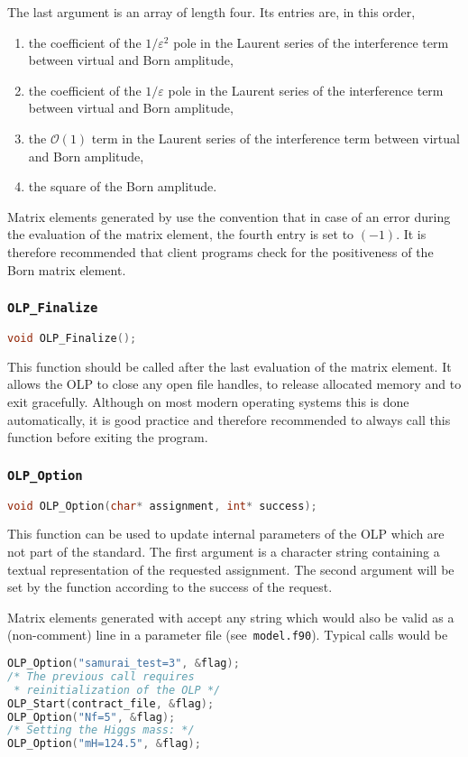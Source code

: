 The last argument is an array of length four. Its entries are, in this order,
\begin{enumerate}
\item the coefficient of the $1/\varepsilon^2$ pole in the Laurent series
   of the interference term between virtual and Born amplitude,
\item the coefficient of the $1/\varepsilon$ pole in the Laurent series
   of the interference term between virtual and Born amplitude,
\item the $\mathcal{O}(1)$ term in the Laurent series
   of the interference term between virtual and Born amplitude,
\item the square of the Born amplitude.
\end{enumerate}

Matrix elements generated by \gosamv{} use the convention that in case
of an error during the evaluation of the matrix element, the fourth
entry is set to $(-1)$. It is therefore recommended that client programs
check for the positiveness of the Born matrix element.

\subsubsection{\texttt{OLP\_Finalize}}
\begin{lstlisting}[language=C]
void OLP_Finalize();
\end{lstlisting}

This function should be called after the last evaluation of the matrix
element. It allows the OLP to close any open file handles, to release
allocated memory and to exit gracefully.
Although on most modern operating systems this is done automatically,
it is good practice and therefore recommended to always call this function
before exiting the program.

\subsubsection{\texttt{OLP\_Option}}
\begin{lstlisting}[language=C]
void OLP_Option(char* assignment, int* success);
\end{lstlisting}

This function can be used to update internal parameters of the OLP which
are not part of the standard. The first argument is a character string
containing a textual representation of the requested assignment. The
second argument will be set by the function according to the success
of the request.

Matrix elements generated with \gosamv{} accept any string which would
also be valid as a (non-comment) line in a parameter
file (see~\texttt{model.f90}). Typical calls would be
\begin{lstlisting}[language=C]
OLP_Option("samurai_test=3", &flag);
/* The previous call requires 
 * reinitialization of the OLP */
OLP_Start(contract_file, &flag);
OLP_Option("Nf=5", &flag);
/* Setting the Higgs mass: */
OLP_Option("mH=124.5", &flag);
\end{lstlisting}
